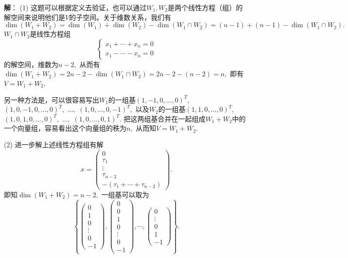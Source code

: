 \newpageorvspace

{\bf 解}： (1) 这题可以根据定义去验证，也可以通过$W_1, W_2$是两个线性方程（组）的解空间来说明他们是$V$的子空间。关于维数关系，我们有
$$\dim (W_1 + W_2) = \dim(W_1) + \dim(W_2) - \dim(W_1 \cap W_2) = (n - 1) + (n - 1) - \dim(W_1 \cap W_2).$$
$W_1 \cap W_2$是线性方程组
$$
\begin{cases}
x_1 + \cdots + x_n = 0 \\
x_1 - \cdots - x_n = 0
\end{cases}
$$
的解空间，维数为$n-2,$ 从而有$\dim (W_1 + W_2) = 2n - 2 - \dim(W_1 \cap W_2) = 2n - 2 - (n - 2) = n,$ 即有$V = W_1 + W_2$.

另一种方法是，可以很容易写出$W_1$的一组基$(1, -1, 0, \ldots, 0)^T,$ $(1, 0, -1, 0, \ldots, 0)^T,$ $\ldots,$ $(1, 0, \ldots, 0, -1)^T,$ 以及$W_2$的一组基$(1, 1, 0, \ldots, 0)^T,$ $(1, 0, 1, 0, \ldots, 0)^T,$ $\ldots,$ $(1, 0, \ldots, 0, 1)^T.$ 把这两组基合并在一起组成$W_1 + W_2$中的一个向量组，容易看出这个向量组的秩为$n,$ 从而知$V = W_1 + W_2.$

(2) 进一步解上述线性方程组有解
$$x = \begin{pmatrix} 0 \\ \tau_1 \\ \vdots \\ \tau_{n-2} \\ -(\tau_1 + \cdots + \tau_{n-2}) \end{pmatrix}.$$
即知$\dim (W_1 + W_2) = n - 2,$ 一组基可以取为
$$\left\{ \begin{pmatrix} 0 \\ 1 \\ 0 \\ \vdots \\ 0 \\ -1 \end{pmatrix}, \begin{pmatrix} 0 \\ 0 \\ 1 \\ 0 \\ \vdots \\ 0 \\ -1 \end{pmatrix}, \cdots, \begin{pmatrix} 0 \\ \vdots \\ 0 \\ 1 \\ -1 \end{pmatrix} \right\}.$$

